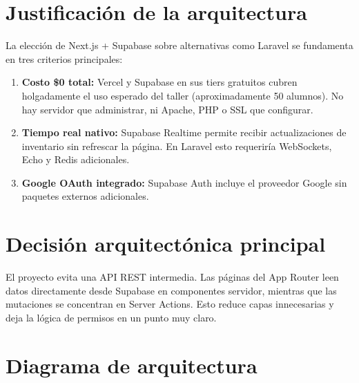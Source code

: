 \documentclass[12pt,a4paper,oneside]{report}
\begin{document}
\section{Justificación de la arquitectura}

La elección de Next.js + Supabase sobre alternativas como Laravel se fundamenta en tres criterios principales:

\begin{enumerate}
  \item \textbf{Costo \$0 total:} Vercel y Supabase en sus tiers gratuitos cubren holgadamente el uso esperado del taller (aproximadamente 50 alumnos). No hay servidor que administrar, ni Apache, PHP o SSL que configurar.
  \item \textbf{Tiempo real nativo:} Supabase Realtime permite recibir actualizaciones de inventario sin refrescar la página. En Laravel esto requeriría WebSockets, Echo y Redis adicionales.
  \item \textbf{Google OAuth integrado:} Supabase Auth incluye el proveedor Google sin paquetes externos adicionales.
\end{enumerate}

\section{Decisión arquitectónica principal}

El proyecto evita una API REST intermedia. Las páginas del App Router leen datos directamente desde Supabase en componentes servidor, mientras que las mutaciones se concentran en Server Actions. Esto reduce capas innecesarias y deja la lógica de permisos en un punto muy claro.

\section{Diagrama de arquitectura}
\end{document}
